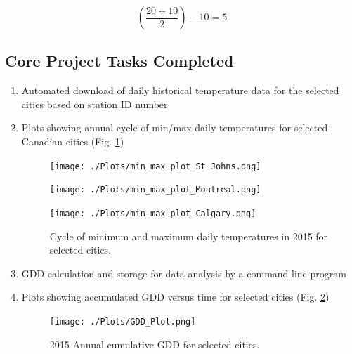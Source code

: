 \documentclass{article}
\begin{document}
\[ \left(\frac {20+10}{2}\right)-10=5 \] \par


\subsection{ \bf Core Project Tasks Completed}

\begin{enumerate}
\item  Automated download of daily historical temperature data for the selected cities based on station ID number
\item  Plots showing annual cycle of min/max daily temperatures for selected Canadian cities (Fig. \ref{gdd_min-max})
\begin{center}
\begin{figure}[!h]
\texttt{[image: ./Plots/min\_max\_plot\_St\_Johns.png]}

\texttt{[image: ./Plots/min\_max\_plot\_Montreal.png]}

\texttt{[image: ./Plots/min\_max\_plot\_Calgary.png]}

\caption{Cycle of minimum and maximum daily temperatures in 2015 for selected cities.}
\label{gdd_min-max}
\end{figure}
\end{center}

\item  GDD calculation and storage for data analysis by a command line program
\item  Plots showing accumulated GDD versus time for selected cities (Fig. \ref{gdd_ann-cycle})
\begin{center}
\begin{figure}[!h]
\texttt{[image: ./Plots/GDD\_Plot.png]}
\caption{2015 Annual cumulative GDD for selected cities.}
\label{gdd_ann-cycle}
\end{figure}
\end{center}

\end{enumerate}
\end{document}
